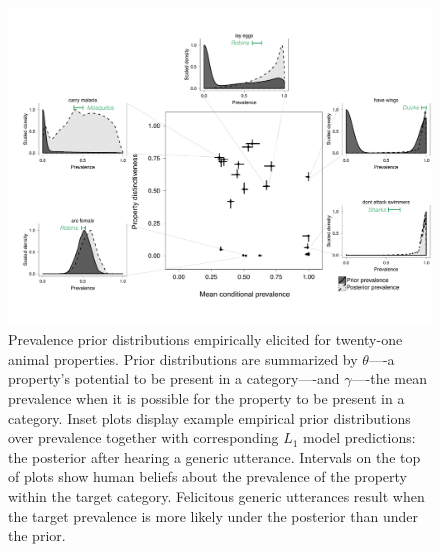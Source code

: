 \documentclass[10pt,letterpaper]{article}
\newcommand{\ndg}[1]{\textcolor{Green}{[ndg: #1]}}
\begin{document}
\begin{figure}
\centering
    \includegraphics[width=\columnwidth]{prevalence-scatter-wDists.pdf}
    \caption{Prevalence prior distributions empirically elicited for twenty-one animal properties.
    Prior distributions are summarized by $\theta$----a property's potential to be present in a category----and $\gamma$----the mean prevalence when it is possible for the property to be present in a category.
    Inset plots display example empirical prior distributions over prevalence together with corresponding $L_1$ model predictions: the posterior after hearing a generic utterance. 
    Intervals on the top of plots show human beliefs about the prevalence of the property within the target category.
    Felicitous generic utterances result when the target prevalence is more likely under the posterior than under the prior.
    }
  \label{fig:priors1a}
\end{figure}
\end{document}
